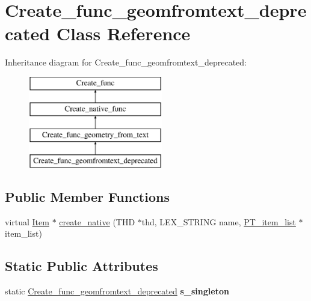 \hypertarget{classCreate__func__geomfromtext__deprecated}{}\section{Create\+\_\+func\+\_\+geomfromtext\+\_\+deprecated Class Reference}
\label{classCreate__func__geomfromtext__deprecated}
Inheritance diagram for Create\+\_\+func\+\_\+geomfromtext\+\_\+deprecated\+:\begin{figure}[H]
\begin{center}
\leavevmode
\includegraphics[height=4.000000cm]{classCreate__func__geomfromtext__deprecated}
\end{center}
\end{figure}
\subsection*{Public Member Functions}
\begin{DoxyCompactItemize}
\item 
virtual \mbox{\hyperlink{classItem}{Item}} $\ast$ \mbox{\hyperlink{classCreate__func__geomfromtext__deprecated_a48d582343e1887825483f737898d2b1f}{create\+\_\+native}} (T\+HD $\ast$thd, L\+E\+X\+\_\+\+S\+T\+R\+I\+NG name, \mbox{\hyperlink{classPT__item__list}{P\+T\+\_\+item\+\_\+list}} $\ast$item\+\_\+list)
\end{DoxyCompactItemize}
\subsection*{Static Public Attributes}
\begin{DoxyCompactItemize}
\item 
\mbox{\label{classCreate__func__geomfromtext__deprecated_aec8a9a87c949f9d8c3bfb238ecac9a06}} 
static \mbox{\hyperlink{classCreate__func__geomfromtext__deprecated}{Create\+\_\+func\+\_\+geomfromtext\+\_\+deprecated}} {\bfseries s\+\_\+singleton}
\end{DoxyCompactItemize}
